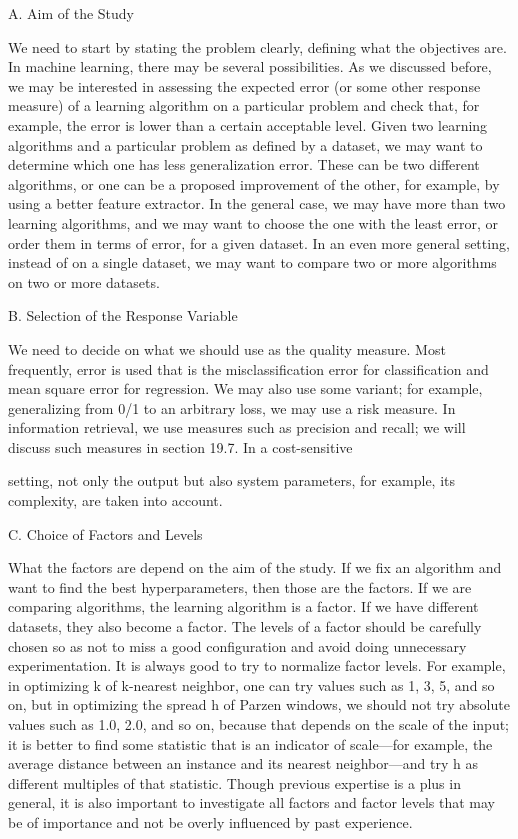 A. Aim of the Study

We need to start by stating the problem clearly, defining what the objectives are. In machine learning, there may be several possibilities. As we discussed before, we may be interested in assessing the expected error (or some other response measure) of a learning algorithm on a particular problem and check that, for example, the error is lower than a certain acceptable level. Given two learning algorithms and a particular problem as defined by a dataset, we may want to determine which one has less generalization error. These can be two different algorithms, or one can be a proposed improvement of the other, for example, by using a better feature extractor. In the general case, we may have more than two learning algorithms, and we may want to choose the one with the least error, or order them in terms of error, for a given dataset. In an even more general setting, instead of on a single dataset, we may want to compare two or more algorithms on two or more datasets.

B. Selection of the Response Variable

We need to decide on what we should use as the quality measure. Most frequently, error is used that is the misclassification error for classification and mean square error for regression. We may also use some variant; for example, generalizing from 0/1 to an arbitrary loss, we may use a risk measure. In information retrieval, we use measures such as precision and recall; we will discuss such measures in section 19.7. In a cost-sensitive

setting, not only the output but also system parameters, for example, its complexity, are taken into account.

C. Choice of Factors and Levels

What the factors are depend on the aim of the study. If we fix an algorithm and want to find the best hyperparameters, then those are the factors. If we are comparing algorithms, the learning algorithm is a factor. If we have different datasets, they also become a factor. The levels of a factor should be carefully chosen so as not to miss a good configuration and avoid doing unnecessary experimentation. It is always good to try to normalize factor levels. For example, in optimizing k of k-nearest neighbor, one can try values such as 1, 3, 5, and so on, but in optimizing the spread h of Parzen windows, we should not try absolute values such as 1.0, 2.0, and so on, because that depends on the scale of the input; it is better to find some statistic that is an indicator of scale---for example, the average distance between an instance and its nearest neighbor---and try h as different multiples of that statistic. Though previous expertise is a plus in general, it is also important to investigate all factors and factor levels that may be of importance and not be overly influenced by past experience.

